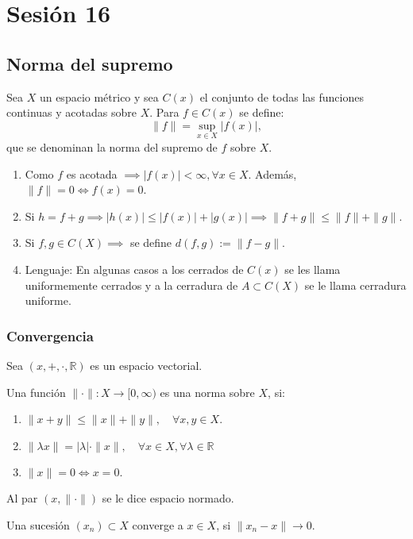 \section{Sesión 16}

\subsection{Norma del supremo}

\begin{definicion}
	Sea $X$ un espacio métrico y sea $C(x)$ el conjunto de todas las funciones continuas y acotadas sobre $X$. Para $f\in C(x)$ se define: 
	$$\|f\|=\sup_{x\in X}|f(x)|,$$
	que se denominan la norma del supremo de $f$ sobre $X$. 
	\begin{enumerate}
		\item Como $f$ es acotada $\implies |f(x)|<\infty, \forall x\in X$. Además, $\|f\|=0\iff f(x)=0$. 
		\item Si $h=f+g\implies |h(x)|\leq |f(x)|+|g(x)|\implies \|f+g\|\leq \|f\|+\| g\|$. 
		\item Si $f,g\in C(X)\implies$ se define $d(f,g):=\|f-g\|$. 
		\item Lenguaje: En algunas casos a los cerrados de $C(x)$ se les llama uniformemente cerrados y a la cerradura de $A\subset C(X)$ se le llama cerradura uniforme. 
	\end{enumerate}
\end{definicion}

\subsubsection{Convergencia}
Sea $(x,+,\cdot, \mathbb{R})$ es un espacio vectorial. 

\begin{definicion}
	Una función $\|\cdot\|: X\to [0,\infty)$ es una norma sobre $X$, si:
	\begin{enumerate}
		\item $\|x+y\|\leq \|x\|+\|y\|,\quad \forall x,y\in X$. 
		\item $\|\lambda x\| =|\lambda| \cdot \|x\|,\quad \forall x\in X, \forall \lambda\in \mathbb{R}$
		\item $\|x\|=0\iff x=0$. 
	\end{enumerate}
Al par $(x,\|\cdot\|)$ se le dice espacio normado. 
\end{definicion}

\begin{definicion}
	Una sucesión $(x_n)\subset X$ converge a $x\in X$, si $\|x_n-x\|\to  0$.
\end{definicion}

